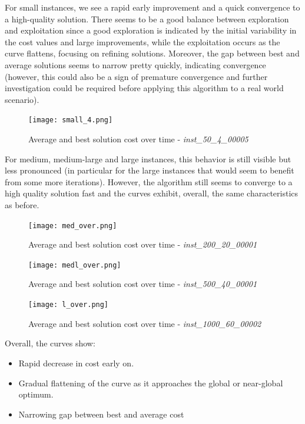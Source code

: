 \documentclass{article}
\begin{document}
For small instances, we see a rapid early improvement and a quick convergence to a high-quality solution. There seems to be a good balance between exploration and exploitation since a good exploration is indicated by the initial variability in the cost values and large improvements, while the exploitation occurs as the curve flattens, focusing on refining solutions. Moreover, the gap between best and average solutions seems to narrow pretty quickly, indicating convergence (however, this could also be a sign of premature convergence and further investigation could be required before applying this algorithm to a real world scenario).

\begin{figure}[H]
    \centering
    \texttt{[image: small\_4.png]}
    \caption{Average and best solution cost over time - \textit{inst\_50\_4\_00005}}
    \label{fig:enter-label}
\end{figure}

For medium, medium-large and large instances, this behavior is still visible but less pronounced (in particular for the large instances that would seem to benefit from some more iterations). However, the algorithm still seems to converge to a high quality solution fast and the curves exhibit, overall, the same characteristics as before. 

\begin{figure}[H]
    \centering
    \texttt{[image: med\_over.png]}
    \caption{Average and best solution cost over time - \textit{inst\_200\_20\_00001}}
    \label{fig:enter-label}
\end{figure}

\begin{figure}[H]
    \centering
    \texttt{[image: medl\_over.png]}
    \caption{Average and best solution cost over time - \textit{inst\_500\_40\_00001}}
    \label{fig:enter-label}
\end{figure}


\begin{figure}[H]
    \centering
    \texttt{[image: l\_over.png]}
    \caption{Average and best solution cost over time - \textit{inst\_1000\_60\_00002}}
    \label{fig:enter-label}
\end{figure}

Overall, the curves show:
\begin{itemize}
    \item Rapid decrease in cost early on.
    \item Gradual flattening of the curve as it approaches the global or near-global optimum.
    \item Narrowing gap between best and average cost
\end{itemize}
\end{document}
